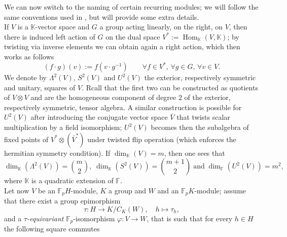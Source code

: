 \documentclass{amsart}
\numberwithin{equation}{section}
\theoremstyle{definition}
\theoremstyle{subresult}
\theoremstyle{caseresult}
\renewcommand{\phi}{\varphi}
\newcommand{\bF}{\mathbb{F}}
\newcommand{\bK}{\mathbb{K}}
\newcommand{\Hom}{\operatorname{Hom}}
\newcommand{\inv}{^{-1}}
\newcommand{\fto}{\longrightarrow}
\newcommand{\<}{\langle}
\renewcommand{\>}{\rangle}
\begin{document}
	We can now switch to the naming of certain recurring modules; we will follow the same conventions used in \cite[Appendix A.2]{Meier-Stell-Stroth:2012}, but will provide some extra details.\\
	If $V$ is a $\bK$-vector space and $G$ a group acting linearly, on the right, on $V$, then there is induced left action of $G$ on the dual space $V^*:= \Hom_\bK(V,\bK)$; by twisting via inverse elements we can obtain again a right action, which then works as follows
	\[
		(f \cdot g)(v) := f(v \cdot g\inv) \qquad \forall f \in V^*, \, \forall g \in G, \, \forall v \in V.
	\]
	We denote by $\Lambda^2(V)$, $S^2(V)$ and $U^2(V)$ the exterior, respectively symmetric and unitary, squares of $V$. Rcall that the first two can be constructed as quotients of $V \otimes V$ and are the homogeneous component of degree $2$ of the exterior, respectively symmetric, tensor algebra. A similar construction is possible for $U^2(V)$ after introducing the conjugate vector space $\bar{V}$ that twists scalar multiplication by a field isomorphism; $U^2(V)$ becomes then the subalgebra of fixed points of $V^* \otimes (\bar{V}^*)$ under twisted flip operation (which enforces the hermitian symmetry condition). If $\dim_{\bK}(V)=m$, then one sees that
	\[
		\dim_{\bK}(\Lambda^2(V)) = \binom{m}{2}, \; \dim_{\bK}(S^2(V)) = \binom{m+1}{2} \; \text{and} \; \dim_{\bF}(U^2(V)) = m^2,
	\]
	where $\bK$ is a quadratic extension of $\bF$.\\
	Let now $V$ be an $\bF_pH$-module, $K$ a group and $W$ and an $\bF_p K$-module; assume that there exist a group epimorphism
	\[
	\tau \colon H \fto K/C_K(W), \quad h \mapsto \tau_h,
	\]
	and a \emph{$\tau$-equivariant} $\bF_p$-isomorphism $\phi  \colon V \fto W$, that is such that for every $h \in H$ the following square commutes 
	\begin{center}
	\end{center}
\end{document}
